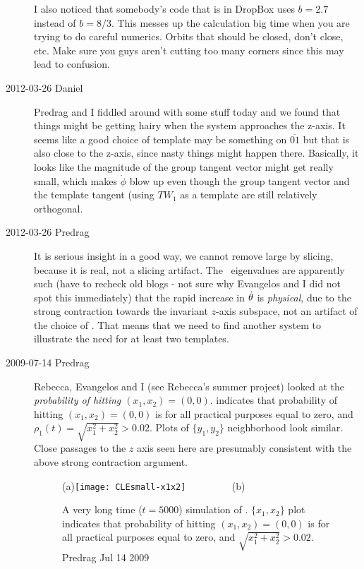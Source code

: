 \begin{description}
I also noticed that somebody's code that is in DropBox uses $b = 2.7$
instead of $b = 8/3$. This messes up the calculation big time when you
are trying to do careful numerics. Orbits that should be closed, don't
close, etc. Make sure you guys aren't cutting too many corners since this
may lead to confusion.

\item[2012-03-26 Daniel]
Predrag and I fiddled around with some stuff today and we found that
things might be getting hairy when the system approaches the z-axis. It
seems like a good choice of template may be something on $\overline{01}$
but that is also close to the z-axis, since nasty things might happen
there. Basically, it looks like the magnitude of the group tangent vector
might get really small, which makes $\dot{\phi}$ blow up even though the
group tangent vector and the template tangent (using $TW_1$ as a template
are still relatively orthogonal.

\item[2012-03-26 Predrag] It is serious insight in a good way, we cannot remove
large {\phaseVel} by slicing, because it is real, not a slicing artifact.
The \eqv\ eigenvalues are apparently such (have to recheck old blogs -
not sure why Evangelos and I did not spot this immediately) that the
rapid increase in {\phaseVel} $\dot{\theta}$ is \emph{physical}, due to
the strong contraction towards the invariant $z$-axis subspace, not an
artifact of the choice of \slice. That means that we need to find another
system to illustrate the need for at least two templates.

\item[2009-07-14 Predrag] Rebecca, Evangelos and I (see
 {Rebecca's summer project})
looked at the {\em probability of hitting $(x_1,x_2) =(0,0)$}.
 indicates that probability of hitting
$(x_1,x_2) =(0,0)$ is for all practical purposes equal to zero, and
$\rho_1(t)=\sqrt{x_1^2+x_2^2} > 0.02$. Plots of $\{y_1,y_2\}$
neighborhood look similar. Close passages to the $z$ axis seen here
are presumably consistent with the above strong contraction argument.

 \begin{figure}
 \begin{center}
(a)\texttt{[image: CLEsmall-x1x2]}%
~~~~~~~~
(b) %
 \end{center}
 \caption{\label{fig:CLEsmall-x1x2}
A very long time ($t=5000$) simulation of \cLf. $\{x_1,x_2\}$ plot indicates
that probability of hitting $(x_1,x_2) =(0,0)$ is for all practical purposes
equal to zero, and $\sqrt{x_1^2+x_2^2} > 0.02$.
\hfill Predrag {Jul 14 2009}
}
\end{figure}


\end{description}
